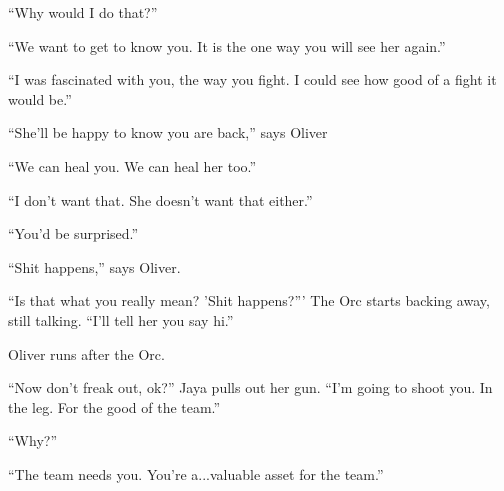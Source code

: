 ``Why would I do that?''

``We want to get to know you.  It is the one way you will see her again.''

``I was fascinated with you, the way you fight.  I could see how good of a fight it would be.''

``She'll be happy to know you are back,'' says Oliver

``We can heal you.  We can heal her too.''

``I don't want that.  She doesn't want that either.''

``You'd be surprised.''

``Shit happens,'' says Oliver.

``Is that what you really mean?  'Shit happens?'''  The Orc starts backing away, still talking. ``I'll tell her you say hi.''

Oliver runs after the Orc.







``Now don't freak out, ok?'' Jaya pulls out her gun.  ``I'm going to shoot you.  In the leg.  For the good of the team.''

``Why?''

``The team needs you.  You're a...valuable asset for the team.''

